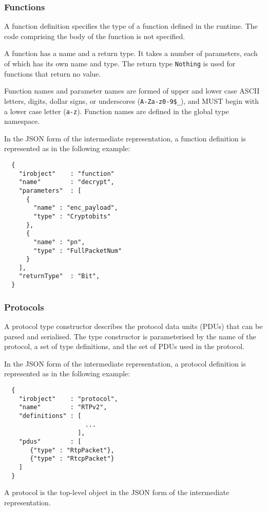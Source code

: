 \documentclass[10pt,twocolumn,a4paper]{article}
\newcommand{\code}[1]{\texttt{#1}}
\begin{document}
\subsubsection{Functions}
\label{sec:functions}

A function definition specifies the type of a function defined in the
runtime. The code comprising the body of the function is not specified. 

A function has a name and a return type. It takes a number of parameters,
each of which has its own name and type. The return type \code{Nothing}
is used for functions that return no value.

Function names and parameter names are formed of upper and lower case ASCII
letters, digits, dollar signs, or underscores (\code{A-Za-z0-9\$\_}), and
MUST begin with a lower case letter (\code{a-z}).
Function names are defined in the global type namespace.

In the JSON form of the intermediate representation, a function definition
is represented as in the following example:
\footnotesize
\begin{verbatim}
  {
    "irobject"    : "function"
    "name"        : "decrypt",
    "parameters"  : [
      {
        "name" : "enc_payload",
        "type" : "Cryptobits"
      },
      {
        "name" : "pn",
        "type" : "FullPacketNum"
      }
    ],
    "returnType"  : "Bit",
  }
\end{verbatim}
\normalsize

\subsubsection{Protocols}

A protocol type constructor describes the protocol data units (PDUs) that
can be parsed and serialised. The type constructor is parameterised by the
name of the protocol, a set of type definitions, and the set of PDUs used
in the protocol.

In the JSON form of the intermediate representation, a protocol definition
is represented as in the following example:
\footnotesize
\begin{verbatim}
  {
    "irobject"    : "protocol",
    "name"        : "RTPv2",
    "definitions" : [
                      ...
                    ],
    "pdus"        : [
       {"type" : "RtpPacket"},
       {"type" : "RtcpPacket"}
    ]
  }
\end{verbatim}
\normalsize
A protocol is the top-level object in the JSON form of the intermediate
representation.
\end{document}
